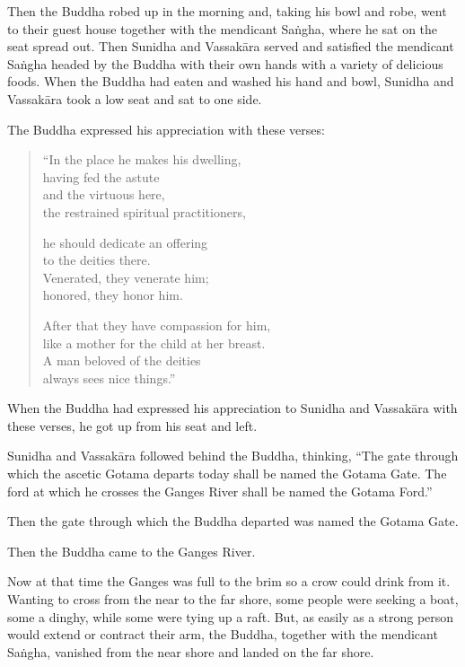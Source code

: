 \documentclass[12pt,openany]{book}%
\begin{document}
Then the Buddha robed up in the morning and, taking his bowl and robe, went to their guest house together with the mendicant \textsanskrit{Saṅgha}, where he sat on the seat spread out. Then Sunidha and \textsanskrit{Vassakāra} served and satisfied the mendicant \textsanskrit{Saṅgha} headed by the Buddha with their own hands with a variety of delicious foods. When the Buddha had eaten and washed his hand and bowl, Sunidha and \textsanskrit{Vassakāra} took a low seat and sat to one side. 

The Buddha expressed his appreciation with these verses: 

\begin{verse}%
“In the place he makes his dwelling, \\
having fed the astute \\
and the virtuous here, \\
the restrained spiritual practitioners, 

he should dedicate an offering \\
to the deities there. \\
Venerated, they venerate him; \\
honored, they honor him. 

After that they have compassion for him, \\
like a mother for the child at her breast. \\
A man beloved of the deities \\
always sees nice things.” 

%
\end{verse}

When the Buddha had expressed his appreciation to Sunidha and \textsanskrit{Vassakāra} with these verses, he got up from his seat and left. 

Sunidha and \textsanskrit{Vassakāra} followed behind the Buddha, thinking, “The gate through which the ascetic Gotama departs today shall be named the Gotama Gate. The ford at which he crosses the Ganges River shall be named the Gotama Ford.” 

Then the gate through which the Buddha departed was named the Gotama Gate. 

Then the Buddha came to the Ganges River. 

Now at that time the Ganges was full to the brim so a crow could drink from it. Wanting to cross from the near to the far shore, some people were seeking a boat, some a dinghy, while some were tying up a raft. But, as easily as a strong person would extend or contract their arm, the Buddha, together with the mendicant \textsanskrit{Saṅgha}, vanished from the near shore and landed on the far shore. 
\end{document}
